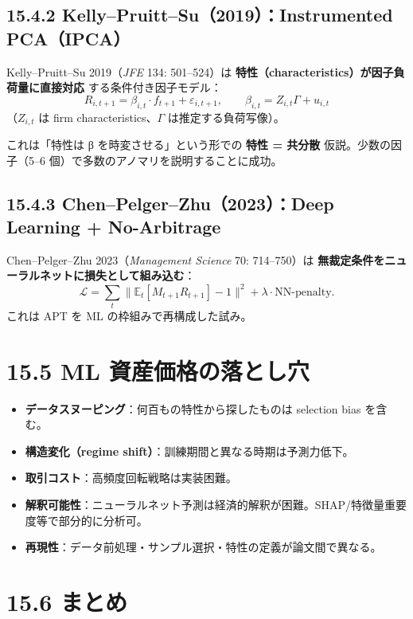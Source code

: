 \documentclass[11pt,a4paper]{report}
\begin{document}
\subsection{15.4.2 Kelly–Pruitt–Su（2019）：Instrumented PCA（IPCA）}

Kelly–Pruitt–Su 2019（\emph{JFE} 134: 501–524）は \textbf{特性（characteristics）が因子負荷量に直接対応} する条件付き因子モデル： \[ R_{i,t+1} = \beta_{i,t} \cdot f_{t+1} + \varepsilon_{i,t+1}, \qquad \beta_{i,t} = Z_{i,t} \Gamma + u_{i,t} \] （$Z_{i,t}$ は firm characteristics、$\Gamma$ は推定する負荷写像）。

これは「特性は β を時変させる」という形での \textbf{特性 = 共分散} 仮説。少数の因子（5–6 個）で多数のアノマリを説明することに成功。

\subsection{15.4.3 Chen–Pelger–Zhu（2023）：Deep Learning + No-Arbitrage}

Chen–Pelger–Zhu 2023（\emph{Management Science} 70: 714–750）は \textbf{無裁定条件をニューラルネットに損失として組み込む}： \[ \mathcal{L} = \sum_t \| \mathbb{E}_t[M_{t+1} R_{t+1}] - 1 \|^2 + \lambda \cdot \mathrm{NN\text{-}penalty}. \] これは APT を ML の枠組みで再構成した試み。

\section{15.5 ML 資産価格の落とし穴}

\begin{itemize}
\item \textbf{データスヌーピング}：何百もの特性から探したものは selection bias を含む。
\item \textbf{構造変化（regime shift）}：訓練期間と異なる時期は予測力低下。
\item \textbf{取引コスト}：高頻度回転戦略は実装困難。
\item \textbf{解釈可能性}：ニューラルネット予測は経済的解釈が困難。SHAP/特徴量重要度等で部分的に分析可。
\item \textbf{再現性}：データ前処理・サンプル選択・特性の定義が論文間で異なる。
\end{itemize}

\section{15.6 まとめ}
\end{document}
